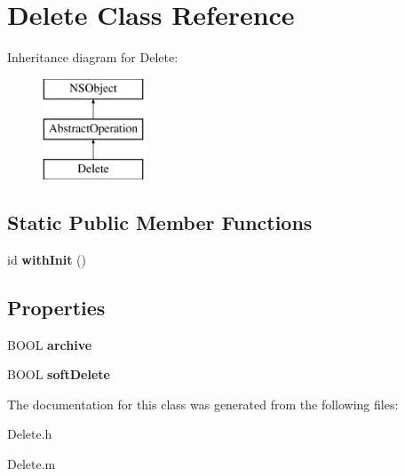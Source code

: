 \hypertarget{interface_delete}{
\section{\-Delete \-Class \-Reference}
\label{interface_delete}
}
\-Inheritance diagram for \-Delete\-:\begin{figure}[H]
\begin{center}
\leavevmode
\includegraphics[height=3.000000cm]{interface_delete}
\end{center}
\end{figure}
\subsection*{\-Static \-Public \-Member \-Functions}
\begin{DoxyCompactItemize}
\item 
\hypertarget{interface_delete_a509895b97a6b24fb9b552988b3295f21}{
id {\bfseries with\-Init} ()}
\label{interface_delete_a509895b97a6b24fb9b552988b3295f21}

\end{DoxyCompactItemize}
\subsection*{\-Properties}
\begin{DoxyCompactItemize}
\item 
\hypertarget{interface_delete_a8568b55e58d6c99df6c630c446c83d67}{
\-B\-O\-O\-L {\bfseries archive}}
\label{interface_delete_a8568b55e58d6c99df6c630c446c83d67}

\item 
\hypertarget{interface_delete_a9df765a815b8c3118c3a5ee28f1a3213}{
\-B\-O\-O\-L {\bfseries soft\-Delete}}
\label{interface_delete_a9df765a815b8c3118c3a5ee28f1a3213}

\end{DoxyCompactItemize}


\-The documentation for this class was generated from the following files\-:\begin{DoxyCompactItemize}
\item 
\-Delete.\-h\item 
\-Delete.\-m\end{DoxyCompactItemize}
